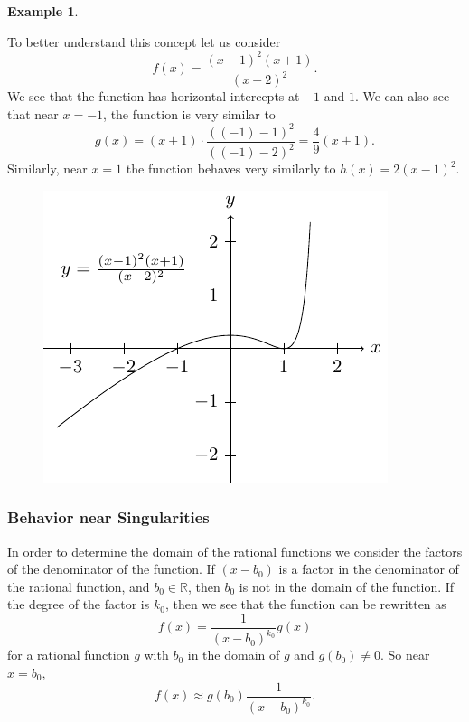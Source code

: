 \documentclass[
]{book}
\theoremstyle{definition}
\theoremstyle{definition}
\newtheorem{example}{Example}[chapter]
\theoremstyle{definition}
\theoremstyle{definition}
\theoremstyle{remark}
\begin{document}
\begin{example}
\protect\hypertarget{exm:unlabeled-div-134}{}\label{exm:unlabeled-div-134}

To better understand this concept let us consider \[f(x)=\frac{(x-1)^2(x+1)}{(x-2)^2}.\]
We see that the function has horizontal intercepts at \(-1\) and \(1\). We can also see that near \(x=-1\), the function is very similar to \[g(x)= (x+1) \cdot \frac{ ((-1)-1)^2}{((-1)-2)^2}= \frac{4}{9} (x+1).\] Similarly, near \(x=1\) the function behaves very similarly to \(h(x)= 2(x-1)^2\).

\begin{figure}

{\centering \includegraphics[width=0.5\linewidth]{tikz/rational1} 

}

\end{figure}

\end{example}

\hypertarget{behavior-near-singularities}{%
\subsubsection{Behavior near Singularities}\label{behavior-near-singularities}}

In order to determine the domain of the rational functions we consider the factors of the denominator of the function. If \((x-b_0)\) is a factor in the denominator of the rational function, and \(b_0\in \mathbb{R}\), then \(b_0\) is not in the domain of the function. If the degree of the factor is \(k_0\), then we see that the function can be rewritten as \[f(x)= \frac{1}{(x-b_0)^{k_0}} g(x)\] for a rational function \(g\) with \(b_0\) in the domain of \(g\) and \(g(b_0)\neq 0\). So near \(x=b_0\), \[f(x) \approx g(b_0) \frac{1}{(x-b_0)^{k_0}}.\]
\end{document}
